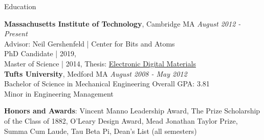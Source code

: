 \documentclass{resume} %
\begin{document}

\begin{rSection}{Education}

{\bf Massachusetts Institute of Technology}, Cambridge MA \hfill {\em August 2012 - Present}
\\ Advisor: Neil Gershenfeld | Center for Bits and Atoms
\\ PhD Candidate | 2019, 
\\ Master of Science | 2014, Thesis: \href{http://cba.mit.edu/docs/theses/14.08.Langford.pdf}{Electronic Digital Materials}
\smallskip
\\{\bf Tufts University}, Medford MA \hfill {\em August 2008 - May 2012}
\\ Bachelor of Science in Mechanical Engineering \hfill { Overall GPA: 3.81}
\\ Minor in Engineering Management

\begingroup\leftskip=0.7cm

{\bf Honors and Awards}: Vincent Manno Leadership Award, The Prize Scholarship of the Class of 1882, O’Leary Design Award, Mead Jonathan Taylor Prize, Summa Cum Laude, Tau Beta Pi, Dean’s List (all semesters)

\endgroup

\end{rSection}
\end{document}
